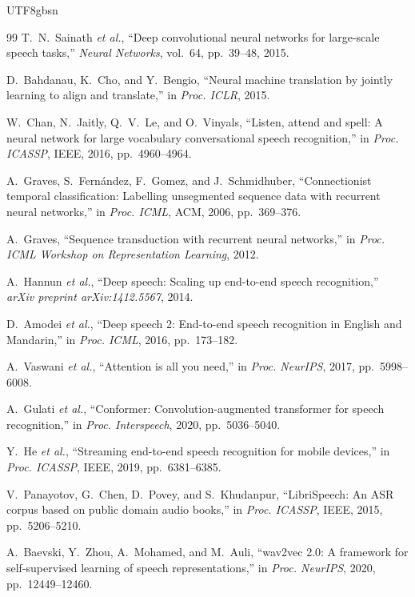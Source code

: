 \documentclass[12pt,a4paper]{article}
\newcommand{\etal}{\textit{et al.}}
\begin{document}
\begin{CJK}{UTF8}{gbsn}
\begin{thebibliography}{99}
T.~N.~Sainath \etal,
``Deep convolutional neural networks for large-scale speech tasks,''
\textit{Neural Networks}, vol.~64, pp.~39--48, 2015.

D.~Bahdanau, K.~Cho, and Y.~Bengio,
``Neural machine translation by jointly learning to align and translate,''
in \textit{Proc. ICLR}, 2015.

W.~Chan, N.~Jaitly, Q.~V.~Le, and O.~Vinyals,
``Listen, attend and spell: A neural network for large vocabulary conversational speech recognition,''
in \textit{Proc. ICASSP}, IEEE, 2016, pp.~4960--4964.

A.~Graves, S.~Fern\'{a}ndez, F.~Gomez, and J.~Schmidhuber,
``Connectionist temporal classification: Labelling unsegmented sequence data with recurrent neural networks,''
in \textit{Proc. ICML}, ACM, 2006, pp.~369--376.

A.~Graves,
``Sequence transduction with recurrent neural networks,''
in \textit{Proc. ICML Workshop on Representation Learning}, 2012.

A.~Hannun \etal,
``Deep speech: Scaling up end-to-end speech recognition,''
\textit{arXiv preprint arXiv:1412.5567}, 2014.

D.~Amodei \etal,
``Deep speech 2: End-to-end speech recognition in English and Mandarin,''
in \textit{Proc. ICML}, 2016, pp.~173--182.

A.~Vaswani \etal,
``Attention is all you need,''
in \textit{Proc. NeurIPS}, 2017, pp.~5998--6008.

A.~Gulati \etal,
``Conformer: Convolution-augmented transformer for speech recognition,''
in \textit{Proc. Interspeech}, 2020, pp.~5036--5040.

Y.~He \etal,
``Streaming end-to-end speech recognition for mobile devices,''
in \textit{Proc. ICASSP}, IEEE, 2019, pp.~6381--6385.

V.~Panayotov, G.~Chen, D.~Povey, and S.~Khudanpur,
``LibriSpeech: An ASR corpus based on public domain audio books,''
in \textit{Proc. ICASSP}, IEEE, 2015, pp.~5206--5210.

A.~Baevski, Y.~Zhou, A.~Mohamed, and M.~Auli,
``wav2vec 2.0: A framework for self-supervised learning of speech representations,''
in \textit{Proc. NeurIPS}, 2020, pp.~12449--12460.


\end{thebibliography}
\end{CJK}
\end{document}
